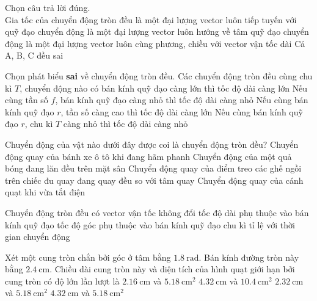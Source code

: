 \begin{ex}
	Chọn câu trả lời đúng.\\
	 Gia tốc của chuyển động tròn đều 
	\choice
	{là một đại lượng vector luôn tiếp tuyến với quỹ đạo chuyển động}
	{\True là một đại lượng vector luôn hướng về tâm quỹ đạo chuyển động}
	{là một đại lượng vector luôn cùng phương, chiều với vector vận tốc dài}
	{Cả A, B, C đều sai}
	\loigiai{}
\end{ex}
	\begin{ex}
	Chọn phát biểu \textbf{sai} về chuyển động tròn đều.	
		\choice
		{Các chuyển động tròn đều cùng chu kì $T$, chuyển động nào có bán kính quỹ đạo càng lớn thì tốc độ dài càng lớn}
		{Nếu cùng tần số $f$, bán kính quỹ đạo càng nhỏ thì tốc độ dài càng nhỏ}
		{Nếu cùng bán kính quỹ đạo $r$, tần số càng cao thì tốc độ dài càng lớn}
		{\True Nếu cùng bán kính quỹ đạo $r$, chu kì $T$ càng nhỏ thì tốc độ dài càng nhỏ}
		\loigiai{}
	\end{ex}
\begin{ex}
	Chuyển động của vật nào dưới đây được coi là chuyển động tròn đều?
	\choice
	{Chuyển động quay của bánh xe ô tô khi đang hãm phanh}
	{Chuyển động của một quả bóng đang lăn đều trên mặt sân}
	{\True Chuyển động quay của điểm treo các ghế ngồi trên chiếc đu quay đang quay đều so với tâm quay}
	{Chuyển động quay của cánh quạt khi vừa tắt điện}
	\loigiai{}
\end{ex}
\begin{ex}
	Chuyển động tròn đều có
	\choice
	{vector vận tốc không đổi}
	{\True tốc độ dài phụ thuộc vào bán kính quỹ đạo}
	{tốc độ góc phụ thuộc vào bán kính quỹ đạo}
	{chu kì tỉ lệ với thời gian chuyển động}
\end{ex}
\begin{ex}
	Xét một cung tròn chắn bởi góc ở tâm bằng $\SI{1.8}{\radian}$. Bán kính đường tròn này bằng $\SI{2.4}{\centi\meter}$. Chiều dài cung tròn này và diện tích của hình quạt giới hạn bởi cung tròn có độ lớn lần lượt là
	\choice
	{$\SI{2.16}{\centi\meter}$ và $\SI{5.18}{\centi\meter^2}$}
	{$\SI{4.32}{\centi\meter}$ và $\SI{10.4}{\centi\meter^2}$}
	{$\SI{2.32}{\centi\meter}$ và $\SI{5.18}{\centi\meter^2}$}
	{\True $\SI{4.32}{\centi\meter}$ và $\SI{5.18}{\centi\meter^2}$}
\end{ex}
